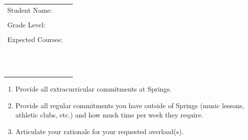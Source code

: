 \begin{tabular}{ll}
Student Name: & \underline{\hspace{7cm}}\\
&\\
Grade Level:  & \underline{\hspace{7cm}}\\
&\\
Expected Courses: & \underline{\hspace{7cm}}\\
&\\
& \underline{\hspace{7cm}}\\
&\\
& \underline{\hspace{7cm}}\\
&\\
& \underline{\hspace{7cm}}\\
&\\
& \underline{\hspace{7cm}}\\
&\\
& \underline{\hspace{7cm}}\\
&\\
& \underline{\hspace{7cm}}
\end{tabular}



 
 
 
 
 
 
 
\begin{enumerate}
  \item Provide all extracurricular commitments at Springs.
  
  \vfill
  
  \item Provide all regular commitments you have outside of Springs (music lessons, athletic clubs, etc.) and how much time per week they require.
  
  \vfill
  
  \item Articulate your rationale for your requested overload(s).
  
  \vfill
  
\end{enumerate} 






































